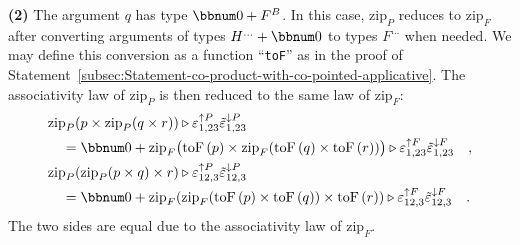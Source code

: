 \textbf{(2)} The argument $q$ has type $\bbnum 0+F^{B}$. In this
case, $\text{zip}_{P}$ reduces to $\text{zip}_{F}$ after converting
arguments of types $H^{...}+\bbnum 0$ to types $F^{...}$ when needed.
We may define this conversion as a function \textsf{``}\lstinline!toF!\textsf{''}
as in the proof of Statement~\ref{subsec:Statement-co-product-with-co-pointed-applicative}.
The associativity law of $\text{zip}_{P}$ is then reduced to the
same law of $\text{zip}_{F}$:
\begin{align*}
 & \text{zip}_{P}(p\times\text{zip}_{P}(q\times r))\triangleright\varepsilon_{1,23}^{\uparrow P}\tilde{\varepsilon}_{1,23}^{\downarrow P}\\
 & \quad=\bbnum 0+\text{zip}_{F}\big(\text{toF}\left(p\right)\times\text{zip}_{F}(\text{toF}\left(q\right)\times\text{toF}\left(r\right))\big)\triangleright\varepsilon_{1,23}^{\uparrow F}\tilde{\varepsilon}_{1,23}^{\downarrow F}\quad,\\
 & \text{zip}_{P}(\text{zip}_{P}(p\times q)\times r)\triangleright\varepsilon_{12,3}^{\uparrow P}\tilde{\varepsilon}_{12,3}^{\downarrow P}\\
 & \quad=\bbnum 0+\text{zip}_{F}(\text{zip}_{F}(\text{toF}\left(p\right)\times\text{toF}\left(q\right))\times\text{toF}\left(r\right))\triangleright\varepsilon_{12,3}^{\uparrow F}\tilde{\varepsilon}_{12,3}^{\downarrow F}\quad.
\end{align*}
The two sides are equal due to the associativity law of $\text{zip}_{F}$.

